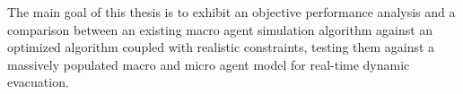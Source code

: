 The main goal of this thesis is to exhibit an objective performance analysis and a comparison between an existing macro agent simulation algorithm against an optimized algorithm coupled with realistic constraints, testing them against a massively populated macro and micro agent model for real-time dynamic evacuation.